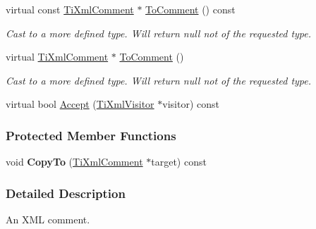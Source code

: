 \begin{DoxyCompactItemize}
\item 
\hypertarget{class_ti_xml_comment_a00fb4215c20a2399ea05ac9b9e7e68a0}{
virtual const \hyperlink{class_ti_xml_comment}{TiXmlComment} $\ast$ \hyperlink{class_ti_xml_comment_a00fb4215c20a2399ea05ac9b9e7e68a0}{ToComment} () const }
\label{class_ti_xml_comment_a00fb4215c20a2399ea05ac9b9e7e68a0}

\begin{DoxyCompactList}\small\item\em Cast to a more defined type. Will return null not of the requested type. \item\end{DoxyCompactList}\item 
\hypertarget{class_ti_xml_comment_acc7c7e07e13c23f17797d642981511df}{
virtual \hyperlink{class_ti_xml_comment}{TiXmlComment} $\ast$ \hyperlink{class_ti_xml_comment_acc7c7e07e13c23f17797d642981511df}{ToComment} ()}
\label{class_ti_xml_comment_acc7c7e07e13c23f17797d642981511df}

\begin{DoxyCompactList}\small\item\em Cast to a more defined type. Will return null not of the requested type. \item\end{DoxyCompactList}\item 
virtual bool \hyperlink{class_ti_xml_comment_a4382de0e50da973f11a23ea5852568bd}{Accept} (\hyperlink{class_ti_xml_visitor}{TiXmlVisitor} $\ast$visitor) const 
\end{DoxyCompactItemize}
\subsubsection*{Protected Member Functions}
\begin{DoxyCompactItemize}
\item 
\hypertarget{class_ti_xml_comment_a3175b2f27628f4fb7a043897930cd934}{
void {\bfseries CopyTo} (\hyperlink{class_ti_xml_comment}{TiXmlComment} $\ast$target) const }
\label{class_ti_xml_comment_a3175b2f27628f4fb7a043897930cd934}

\end{DoxyCompactItemize}


\subsubsection{Detailed Description}
An XML comment. 

